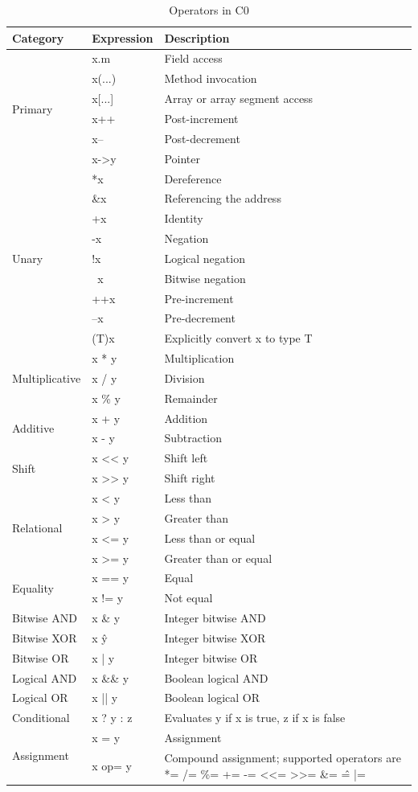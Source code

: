 \documentclass[a4paper]{article}
\begin{document}
\begin{table}[htbp]
\centering
\caption{Operators in C0}
\begin{tabular}{|l|l|l|}
\hline
Category & Expression & Description\\
\hline
\multirow{6}{*}{Primary} & x.m & Field access\\
 & x(...) & Method invocation\\
 & x[...] & Array or array segment access\\
 & x++ & Post-increment\\
 & x-- & Post-decrement\\
 & x->y & Pointer\\ \hline
\multirow{9}{*}{Unary} & *x & Dereference\\
 & \&x & Referencing the address\\
 & +x & Identity\\
 & -x & Negation\\
 & !x & Logical negation\\
 & ~x & Bitwise negation\\
 & ++x & Pre-increment\\
 & --x & Pre-decrement\\
 & (T)x & Explicitly convert x to type T\\ \hline
\multirow{3}{*}{Multiplicative} & x * y & Multiplication\\
 & x / y & Division\\
 & x \% y & Remainder\\ \hline
\multirow{2}{*}{Additive} & x + y & Addition\\
 & x - y & Subtraction\\ \hline
\multirow{2}{*}{Shift} & x << y & Shift left\\
 & x >> y & Shift right\\ \hline
\multirow{4}{*}{Relational} & x < y & Less than\\
 & x > y & Greater than\\
 & x <= y & Less than or equal\\
 & x >= y & Greater than or equal\\ \hline
\multirow{2}{*}{Equality} & x == y & Equal\\
 & x != y & Not equal\\ \hline
Bitwise AND & x \& y & Integer bitwise AND\\ \hline
Bitwise XOR & x \^ y & Integer bitwise XOR\\ \hline
Bitwise OR & x | y & Integer bitwise OR\\ \hline
Logical AND & x \&\& y & Boolean logical AND\\ \hline
Logical OR & x || y & Boolean logical OR\\ \hline
Conditional & x ? y : z & Evaluates y if x is true, z if x is false\\ \hline
\multirow{2}{*}{Assignment} & x = y & Assignment\\
 & x op= y & Compound assignment; supported operators are *=  /= \%= +=  -=  <<=  >>=  \&=  \^=  |=\\ \hline
\end{tabular}
\label{table:c0-operators}
\end{table}
\end{document}
